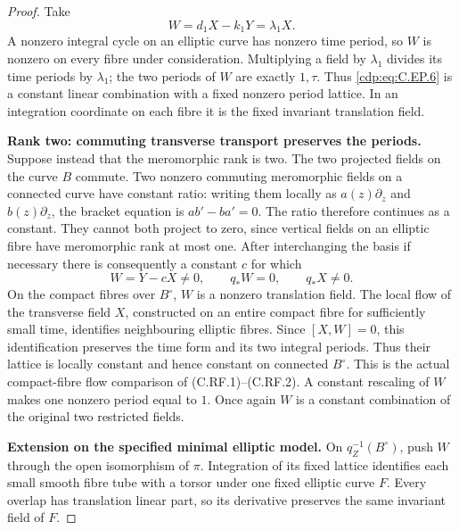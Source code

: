 \begin{proof}
Take
\[
                       W=d_1X-k_1Y=\lambda_1X.
 \tag{C.EP.6}\label{cdp:eq:C.EP.6}
\]
A nonzero integral cycle on an elliptic curve has
nonzero time period, so \(W\) is nonzero on every
fibre under consideration. Multiplying a field by
\(\lambda_1\) divides its time periods by
\(\lambda_1\); the two periods of \(W\) are exactly
\(1,\tau\). Thus \eqref{cdp:eq:C.EP.6} is a constant linear
combination with a fixed nonzero period lattice.
In an integration coordinate on each fibre it
is the fixed invariant translation field.

\par\medskip\noindent\textbf{Rank two: commuting transverse transport preserves the periods.}
Suppose instead that the meromorphic rank is two.
The two projected fields on the curve \(B\)
commute. Two nonzero commuting meromorphic fields
on a connected curve have constant ratio:
writing them locally as \(a(z)\partial_z\) and
\(b(z)\partial_z\), the bracket equation is
\(ab'-ba'=0\). The ratio therefore continues as
a constant. They cannot both project to zero,
since vertical fields on an elliptic fibre have
meromorphic rank at most one. After interchanging
the basis if necessary there is consequently a
constant \(c\) for which
\[
             W=Y-cX\ne0,\qquad q_*W=0,\qquad
                         q_*X\ne0 .
 \tag{C.EP.7}\label{cdp:eq:C.EP.7}
\]
On the compact fibres over \(B^\circ\), \(W\)
is a nonzero translation field. The local flow
of the transverse field \(X\), constructed on
an entire compact fibre for sufficiently small
time, identifies neighbouring elliptic fibres.
Since \([X,W]=0\), this identification preserves
the time form and its two integral periods.
Thus their lattice is locally constant and
hence constant on connected \(B^\circ\).
This is the actual compact-fibre flow comparison
of (C.RF.1)--(C.RF.2). A constant rescaling of
\(W\) makes one nonzero period equal to \(1\).
Once again \(W\) is a constant combination of
the original two restricted fields.

\par\medskip\noindent\textbf{Extension on the specified minimal elliptic model.}
On \(q_Z^{-1}(B^\circ)\), push \(W\) through
the open isomorphism of \(\pi\). Integration of
its fixed lattice identifies each small smooth
fibre tube with a torsor under one fixed elliptic
curve \(F\). Every overlap has translation
linear part, so its derivative preserves the
same invariant field of \(F\).


\end{proof}
